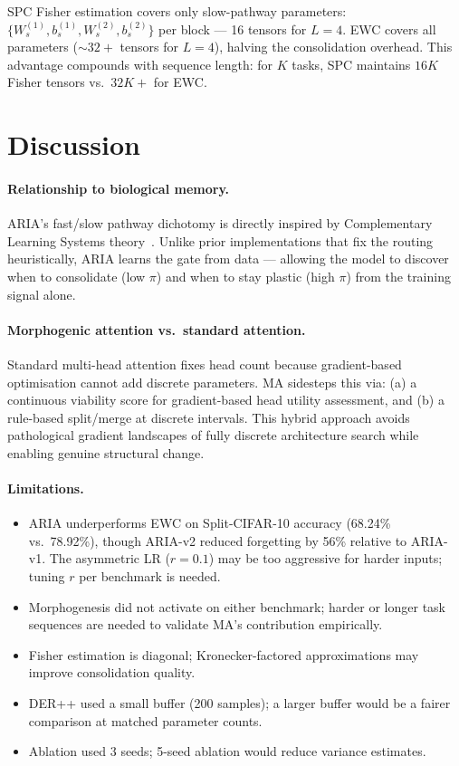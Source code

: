 \documentclass[10pt,twocolumn]{article}
\begin{document}
SPC Fisher estimation covers only slow-pathway parameters:
$\{W_s^{(1)}, b_s^{(1)}, W_s^{(2)}, b_s^{(2)}\}$ per block --- 16 tensors for $L=4$.
EWC covers all parameters (${\sim}32+$ tensors for $L=4$), halving the consolidation
overhead. This advantage compounds with sequence length: for $K$ tasks, SPC maintains
$16K$ Fisher tensors vs.\ $32K+$ for EWC.

\section{Discussion}
\label{sec:discussion}

\paragraph{Relationship to biological memory.}
ARIA's fast/slow pathway dichotomy is directly inspired by Complementary Learning
Systems theory~\citep{mcclelland1995complementary}. Unlike prior implementations
that fix the routing heuristically, ARIA learns the gate from data --- allowing
the model to discover when to consolidate (low $\pi$) and when to stay plastic
(high $\pi$) from the training signal alone.

\paragraph{Morphogenic attention vs.\ standard attention.}
Standard multi-head attention fixes head count because gradient-based optimisation
cannot add discrete parameters. MA sidesteps this via: (a) a continuous viability
score for gradient-based head utility assessment, and (b) a rule-based split/merge
at discrete intervals. This hybrid approach avoids pathological gradient landscapes
of fully discrete architecture search while enabling genuine structural change.

\paragraph{Limitations.}
\begin{itemize}
  \item ARIA underperforms EWC on Split-CIFAR-10 accuracy (68.24\% vs.\ 78.92\%),
    though ARIA-v2 reduced forgetting by 56\% relative to ARIA-v1. The asymmetric LR
    ($r=0.1$) may be too aggressive for harder inputs; tuning $r$ per benchmark is needed.
  \item Morphogenesis did not activate on either benchmark; harder or longer task
    sequences are needed to validate MA's contribution empirically.
  \item Fisher estimation is diagonal; Kronecker-factored approximations may improve
    consolidation quality.
  \item DER++ used a small buffer (200 samples); a larger buffer would be a fairer
    comparison at matched parameter counts.
  \item Ablation used 3 seeds; 5-seed ablation would reduce variance estimates.
\end{itemize}
\end{document}
